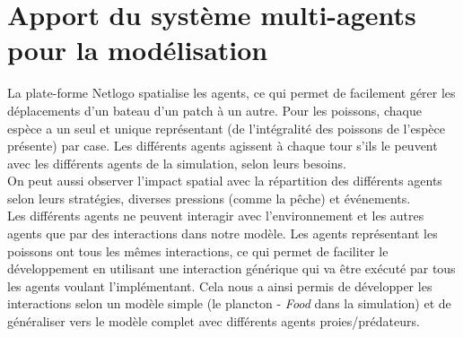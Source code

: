 \section{Apport du système multi-agents pour la modélisation}

La plate-forme Netlogo spatialise les agents, ce qui permet de facilement gérer les déplacements d'un bateau d'un patch à un autre. Pour les poissons, chaque espèce a un seul et unique représentant (de l'intégralité des poissons de l'espèce présente) par case. Les différents agents agissent à chaque tour s'ils le peuvent avec les différents agents de la simulation, selon leurs besoins.
\\
On peut aussi observer l'impact spatial avec la répartition des différents agents selon leurs stratégies, diverses pressions (comme la pêche) et événements.
\\
Les différents agents ne peuvent interagir avec l'environnement et les autres agents que par des interactions dans notre modèle. Les agents représentant les poissons ont tous les mêmes interactions, ce qui permet de faciliter le développement en utilisant une interaction générique qui va être exécuté par tous les agents voulant l'implémentant. Cela nous a ainsi permis de développer les interactions selon un modèle simple (le plancton - \textit{Food} dans la simulation) et de généraliser vers le modèle complet avec différents agents proies/prédateurs.
